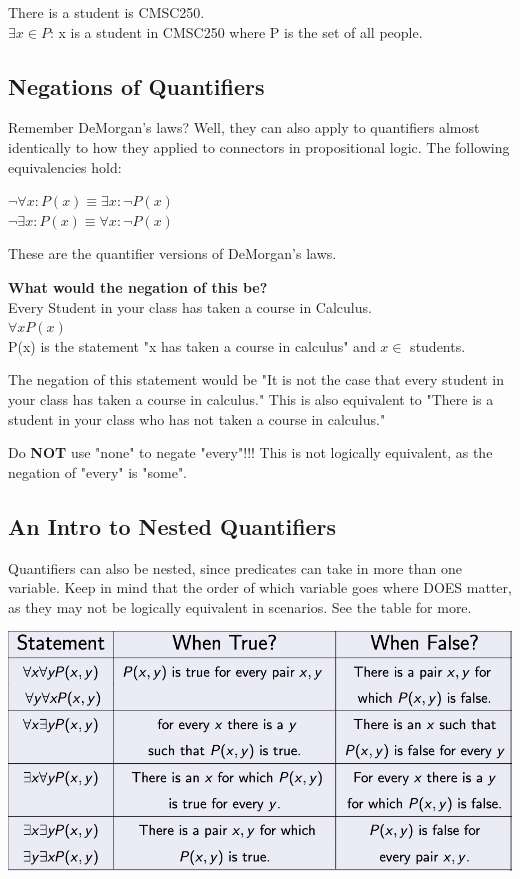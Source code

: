 \begin{example}
    There is a student is CMSC250.\\
    $\exists x \in P$: x is a student in CMSC250 where P is the set of all people. 
\end{example}

\subsection{Negations of Quantifiers}
Remember DeMorgan's laws? Well, they can also apply to quantifiers almost identically to how they applied to connectors in propositional logic. The following equivalencies hold:

\begin{center}
    $\neg \forall x: P(x) \equiv \exists x: \neg P(x)$\\
    $\neg \exists x: P(x) \equiv \forall x: \neg P(x)$
\end{center}

These are the quantifier versions of DeMorgan's laws.

\begin{example}
    \textbf{What would the negation of this be?}\\
    Every Student in your class has taken a course in Calculus.\\
    $\forall x P(x)$\\
    P(x) is the statement "x has taken a course in calculus" and $x \in $ students.
\end{example}

The negation of this statement would be "It is not the case that every student in your class has taken a course in calculus." This is also equivalent to "There is a student in your class who has not taken a course in calculus."

Do \textbf{NOT} use "none" to negate "every"!!! This is not logically equivalent, as the negation of "every" is "some".

\subsection{An Intro to Nested Quantifiers}
Quantifiers can also be nested, since predicates can take in more than one variable. Keep in mind that the order of which variable goes where DOES matter, as they may not be logically equivalent in scenarios. See the table for more.\\

\begin{center}
    \vspace{0in}\includegraphics[scale=.7]{media/table.png} \\
\end{center}
